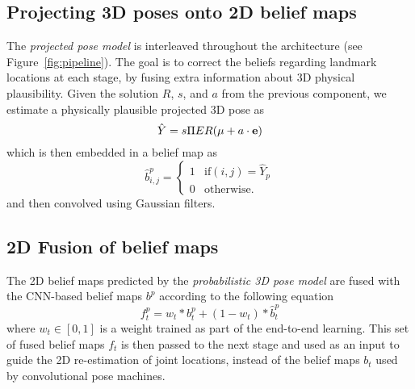 \documentclass[10pt,twocolumn,letterpaper]{article}
\begin{document}
\subsection{Projecting 3D poses onto 2D belief maps}\vspace{-2mm}
\label{sec:projecting_from_3D_to_2D}
The  \textit{projected pose model} is interleaved throughout the
architecture (see Figure~\ref{fig:pipeline}). The goal is to correct
the beliefs regarding landmark locations at each stage, by fusing
extra information about 3D physical plausibility. Given the solution
$R$, $s$, and $a$ from the previous component, we estimate a physically
plausible projected 3D pose as
\begin{equation}\label{eq:proj}
  \hat{Y} = s\Pi E R (\mu + a\cdot {\bf e}  )
\end{equation}
which is then embedded in a belief map as
\begin{equation}
  \hat b^p_{i,j}=\begin{cases}
    1                           & \text{if} (i,j)=\hat Y_p                                                            \\
    0                           & \text{otherwise.}
  \end{cases}
\end{equation}
and then convolved using Gaussian filters.

\subsection{2D Fusion of belief maps}\vspace{-2mm}
\label{sec:fusion_layer}
The 2D belief maps predicted by the  \emph{probabilistic 3D pose model}
are fused with the CNN-based belief maps  $b^p$ according
to the following equation %
\begin{equation}
f_{t}^{p} =  w_t*b_t^p+(1 - w_t)*\hat{b}_t^p
\end{equation}
where $w_t\in[0,1]$ is a weight trained as part of the end-to-end
learning. This set of fused belief maps $f_t$ is then passed to the next
stage and used as an input to guide the 2D re-estimation of joint
locations, instead of the belief maps $b_t$ used by convolutional pose machines.
%
\end{document}
